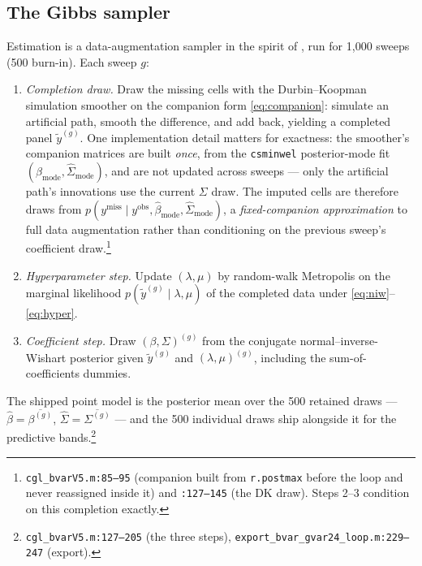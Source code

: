 \documentclass[11pt]{article}
\newcommand{\code}[1]{\texttt{\small #1}}
\begin{document}
\subsection{The Gibbs sampler}

Estimation is a data-augmentation sampler in the spirit of \citet{TannerWong1987}, run for
1{,}000 sweeps (500 burn-in). Each sweep $g$:
\begin{enumerate}[leftmargin=1.8em, itemsep=1pt]
  \item \emph{Completion draw.} Draw the missing cells with the Durbin--Koopman simulation
        smoother \citep{DurbinKoopman2002} on the companion form \eqref{eq:companion}: simulate an
        artificial path, smooth the difference, and add back, yielding a completed panel
        $\tilde y^{(g)}$. One implementation detail matters for exactness: the smoother's
        companion matrices are built \emph{once}, from the \code{csminwel} posterior-mode fit
        $(\hat\beta_{\mathrm{mode}}, \hat\Sigma_{\mathrm{mode}})$, and are not updated across
        sweeps --- only the artificial path's innovations use the current $\Sigma$ draw. The
        imputed cells are therefore draws from
        $p(y^{\mathrm{miss}} \mid y^{\mathrm{obs}}, \hat\beta_{\mathrm{mode}},
        \hat\Sigma_{\mathrm{mode}})$, a \emph{fixed-companion approximation} to full data
        augmentation rather than conditioning on the previous sweep's coefficient
        draw.\footnote{\code{cgl\_bvarV5.m:85--95} (companion built from \code{r.postmax} before
        the loop and never reassigned inside it) and \code{:127--145} (the DK draw). Steps 2--3
        condition on this completion exactly.}
  \item \emph{Hyperparameter step.} Update $(\lambda, \mu)$ by random-walk Metropolis on the
        marginal likelihood $p(\tilde y^{(g)} \mid \lambda, \mu)$ of the completed data under
        \eqref{eq:niw}--\eqref{eq:hyper}.
  \item \emph{Coefficient step.} Draw $(\beta, \Sigma)^{(g)}$ from the conjugate
        normal--inverse-Wishart posterior given $\tilde y^{(g)}$ and $(\lambda, \mu)^{(g)}$,
        including the sum-of-coefficients dummies.
\end{enumerate}
The shipped point model is the posterior mean over the 500 retained draws ---
$\hat\beta = \overline{\beta^{(g)}}$, $\hat\Sigma = \overline{\Sigma^{(g)}}$ --- and the 500
individual draws ship alongside it for the predictive bands.\footnote{\code{cgl\_bvarV5.m:127--205}
(the three steps), \code{export\_bvar\_gvar24\_loop.m:229--247} (export).}
\end{document}
